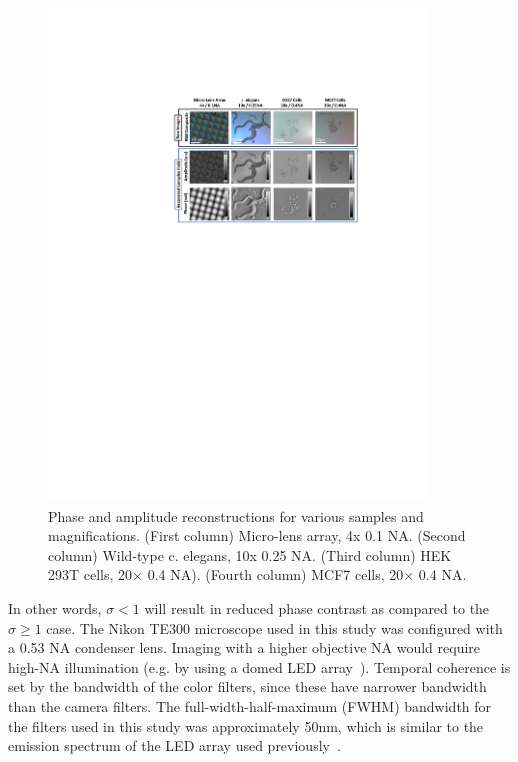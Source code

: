 \begin{figure}[htb]
\centering
\includegraphics[width=0.9\textwidth]{figures/fig_cdpc_video.pdf}
\caption{\label{fig:mosaic}
Phase and amplitude reconstructions for various samples and magnifications. (First column) Micro-lens array, 4x 0.1 NA. (Second column) Wild-type c. elegans, 10x 0.25 NA. (Third column) HEK 293T cells, 20$\times$ 0.4 NA). (Fourth column) MCF7 cells, 20$\times$ 0.4 NA.}
\end{figure}


\noindent In other words, $\sigma < 1$ will result in reduced phase contrast as compared to the $\sigma \geq 1$ case. The Nikon TE300 microscope used in this study was configured with a 0.53 NA condenser lens. Imaging with a higher objective NA would require high-NA illumination (e.g. by using a domed LED array~\cite{phillips2015multi}). Temporal coherence is set by the bandwidth of the color filters, since these have narrower bandwidth than the camera filters. The full-width-half-maximum (FWHM) bandwidth for the filters used in this study was approximately 50nm, which is similar to the emission spectrum of the LED array used previously~\cite{tian2015quantitative}.

